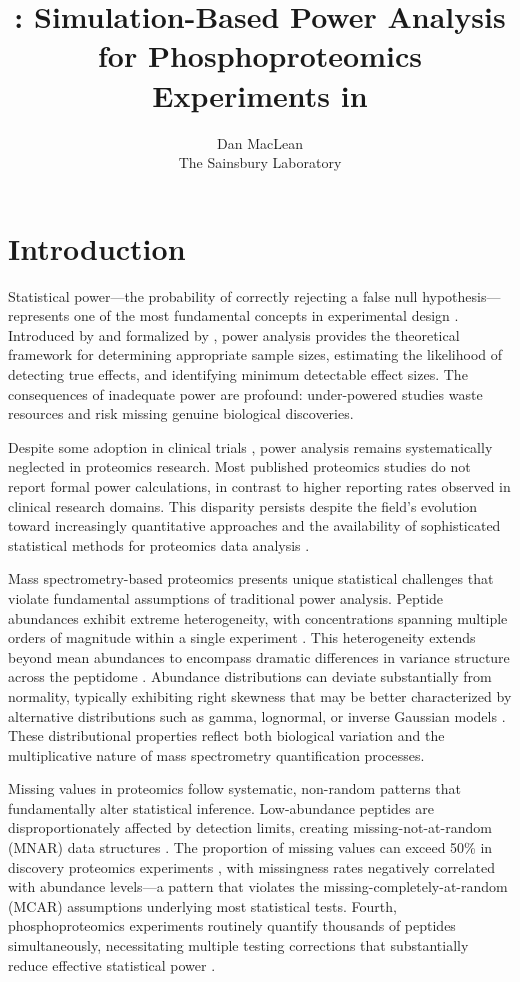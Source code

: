 \documentclass[article]{jss}
\author{Dan MacLean\\The Sainsbury Laboratory}
\title{\pkg{peppwR}: Simulation-Based Power Analysis for Phosphoproteomics Experiments in \proglang{R}}
\begin{document}
\section{Introduction} \label{sec:intro}

Statistical power---the probability of correctly rejecting a false null hypothesis---represents one of the most fundamental concepts in experimental design \citep{cohen1988power}. Introduced by \citet{neyman1933} and formalized by \citet{cohen1962}, power analysis provides the theoretical framework for determining appropriate sample sizes, estimating the likelihood of detecting true effects, and identifying minimum detectable effect sizes. The consequences of inadequate power are profound: under-powered studies waste resources and risk missing genuine biological discoveries.

Despite some adoption in clinical trials \citep{schulz2005sample}, power analysis remains systematically neglected in proteomics research. Most published proteomics studies do not report formal power calculations, in contrast to higher reporting rates observed in clinical research domains. This disparity persists despite the field's evolution toward increasingly quantitative approaches and the availability of sophisticated statistical methods for proteomics data analysis \citep{karp2010addressing}.

Mass spectrometry-based proteomics presents unique statistical challenges that violate fundamental assumptions of traditional power analysis. Peptide abundances exhibit extreme heterogeneity, with concentrations spanning multiple orders of magnitude within a single experiment \citep{olsen2006phosphoproteomics, humphrey2015phosphoproteomics}. This heterogeneity extends beyond mean abundances to encompass dramatic differences in variance structure across the peptidome \citep{karp2010addressing}. Abundance distributions can deviate substantially from normality, typically exhibiting right skewness that may be better characterized by alternative distributions such as gamma, lognormal, or inverse Gaussian models \citep{webb2015mnar}. These distributional properties reflect both biological variation and the multiplicative nature of mass spectrometry quantification processes.

Missing values in proteomics follow systematic, non-random patterns that fundamentally alter statistical inference. Low-abundance peptides are disproportionately affected by detection limits, creating missing-not-at-random (MNAR) data structures \citep{webb2015mnar, lazar2016mnar}. The proportion of missing values can exceed 50\% in discovery proteomics experiments \citep{tyanova2016imputation}, with missingness rates negatively correlated with abundance levels---a pattern that violates the missing-completely-at-random (MCAR) assumptions underlying most statistical tests. Fourth, phosphoproteomics experiments routinely quantify thousands of peptides simultaneously, necessitating multiple testing corrections that substantially reduce effective statistical power \citep{karp2010addressing, zhang2018multiple}.
\end{document}
